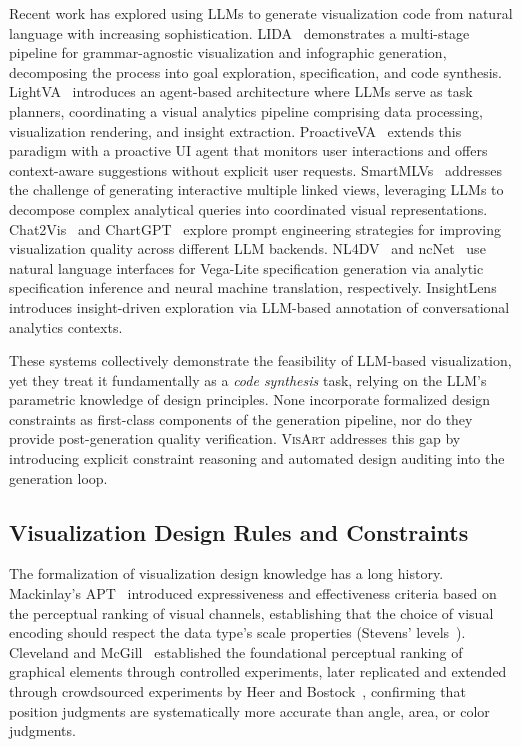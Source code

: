 \documentclass[final,5p,times,twocolumn]{elsarticle}
\newcommand{\sysname}{\textsc{VisArt}}
\begin{document}
Recent work has explored using LLMs to generate visualization code from natural language with increasing sophistication. LIDA~\cite{dibia2023lida} demonstrates a multi-stage pipeline for grammar-agnostic visualization and infographic generation, decomposing the process into goal exploration, specification, and code synthesis. LightVA~\cite{li2024lightva} introduces an agent-based architecture where LLMs serve as task planners, coordinating a visual analytics pipeline comprising data processing, visualization rendering, and insight extraction. ProactiveVA~\cite{zhao2025proactiveva} extends this paradigm with a proactive UI agent that monitors user interactions and offers context-aware suggestions without explicit user requests. SmartMLVs~\cite{shu2025smartmlvs} addresses the challenge of generating interactive multiple linked views, leveraging LLMs to decompose complex analytical queries into coordinated visual representations. Chat2Vis~\cite{maddigan2023chat2vis} and ChartGPT~\cite{tian2024chartgpt} explore prompt engineering strategies for improving visualization quality across different LLM backends. NL4DV~\cite{narechania2020nl4dv} and ncNet~\cite{luo2022ncnet} use natural language interfaces for Vega-Lite specification generation via analytic specification inference and neural machine translation, respectively. InsightLens~\cite{lu2024insightlens} introduces insight-driven exploration via LLM-based annotation of conversational analytics contexts.

These systems collectively demonstrate the feasibility of LLM-based visualization, yet they treat it fundamentally as a \textit{code synthesis} task, relying on the LLM's parametric knowledge of design principles. None incorporate formalized design constraints as first-class components of the generation pipeline, nor do they provide post-generation quality verification. \sysname{} addresses this gap by introducing explicit constraint reasoning and automated design auditing into the generation loop.

\subsection{Visualization Design Rules and Constraints}

The formalization of visualization design knowledge has a long history. Mackinlay's APT~\cite{mackinlay1986automating} introduced expressiveness and effectiveness criteria based on the perceptual ranking of visual channels, establishing that the choice of visual encoding should respect the data type's scale properties (Stevens' levels~\cite{stevens1946theory}). Cleveland and McGill~\cite{cleveland1984graphical} established the foundational perceptual ranking of graphical elements through controlled experiments, later replicated and extended through crowdsourced experiments by Heer and Bostock~\cite{heer2010crowdsourcing}, confirming that position judgments are systematically more accurate than angle, area, or color judgments.
\end{document}
